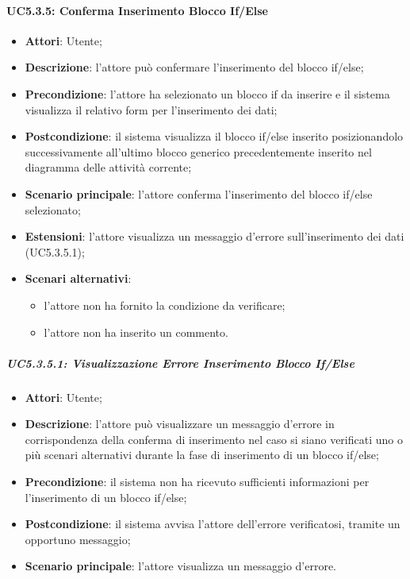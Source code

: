 \begin{itemize}
\begin{itemize}
\begin{itemize}
\begin{itemize}
\paragraph{UC5.3.5: Conferma Inserimento Blocco If/Else}
\label{UC5.3.5}
\begin{itemize}
	\item \textbf{Attori}: Utente;
	\item \textbf{Descrizione}: l'attore può confermare l'inserimento del blocco if/else;
	\item \textbf{Precondizione}: l'attore ha selezionato un blocco if da inserire e il sistema visualizza il relativo form per l'inserimento dei dati;
	\item \textbf{Postcondizione}: il sistema visualizza il blocco if/else inserito posizionandolo successivamente all'ultimo blocco generico precedentemente inserito nel diagramma delle attività corrente;
	\item \textbf{Scenario principale}: l'attore conferma l'inserimento del blocco if/else selezionato;
	\item \textbf{Estensioni}: l'attore visualizza un messaggio d'errore sull'inserimento dei dati (UC5.3.5.1);
	\item \textbf{Scenari alternativi}:
	\begin{itemize}
		\item l'attore non ha fornito la condizione da verificare;
		\item l'attore non ha inserito un commento.
	\end{itemize}
\end{itemize}

\subparagraph{UC5.3.5.1: Visualizzazione Errore Inserimento Blocco If/Else}
\label{UC5.3.5.1}
\begin{itemize}
	\item \textbf{Attori}: Utente;
	\item \textbf{Descrizione}: l'attore può visualizzare un messaggio d'errore in corrispondenza della conferma di inserimento nel caso si siano verificati uno o più scenari alternativi durante la fase di inserimento di un blocco if/else;
	\item \textbf{Precondizione}: il sistema non ha ricevuto sufficienti informazioni per l'inserimento di un blocco if/else;
	\item \textbf{Postcondizione}: il sistema avvisa l'attore dell'errore verificatosi, tramite un opportuno messaggio;
	\item \textbf{Scenario principale}: l'attore visualizza un messaggio d'errore.
\end{itemize}


\end{itemize}
\end{itemize}
\end{itemize}
\end{itemize}
